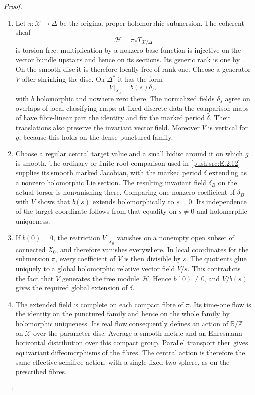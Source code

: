 \begin{proof}

\begin{enumerate}[label={$\langle1\rangle$\arabic*.},leftmargin=*]
\item Let $\pi:\mathcal X\to\Delta$ be the original
proper holomorphic submersion.  The coherent sheaf
\[
 \mathcal H=\pi_*T_{\mathcal X/\Delta}
\]
is torsion-free: multiplication by a nonzero base
function is injective on the vector bundle upstairs
and hence on its sections.  Its generic rank is
one by .  On the smooth disc it is therefore
locally free of rank one.  Choose a generator $V$
after shrinking the disc.  On $\Delta^*$ it has
the form
\[
 V|_{X_s}=b(s)\delta_s,
\]
with $b$ holomorphic and nowhere zero there.
The normalized fields $\delta_s$ agree on overlaps
of local classifying maps: at fixed discrete data
the comparison maps of  have fibre-linear
part the identity and fix the marked period
$\widehat\delta$.  Their translations also
preserve the invariant vector field.
Moreover $V$ is vertical for $g$, because this
holds on the dense punctured family.

\item Choose a regular central target value and a small
bidisc around it on which $g$ is smooth.  The
ordinary or finite-root comparison used in
\ref{push:src:E.2.12} supplies its smooth marked Jacobian, with
the marked period $\widehat\delta$ extending as
a nonzero holomorphic Lie section.  The resulting
invariant field $\delta_B$ on the actual torsor
is nonvanishing there.  Comparing one nonzero
coefficient of $\delta_B$ with $V$ shows that
$b(s)$ extends holomorphically to $s=0$.
Its independence of the target coordinate follows
from that equality on $s\ne0$ and holomorphic
uniqueness.

\item If $b(0)=0$, the restriction $V|_{X_0}$ vanishes
on a nonempty open subset of connected $X_0$,
and therefore vanishes everywhere.  In local
coordinates for the submersion $\pi$, every
coefficient of $V$ is then divisible by $s$.
The quotients glue uniquely to a global
holomorphic relative vector field $V/s$.
This contradicts the fact that $V$ generates
the free module $\mathcal H$.  Hence $b(0)\ne0$,
and $V/b(s)$ gives the required global extension
of $\delta$.

\item The extended field is complete on each compact
fibre of $\pi$.  Its time-one flow is the
identity on the punctured family and hence on
the whole family by holomorphic uniqueness.
Its real flow consequently defines an action
of $\mathbb R/\mathbb Z$ on $\mathcal X$
over the parameter disc.  Average a smooth
metric and an Ehresmann horizontal distribution
over this compact group.  Parallel transport
then gives equivariant diffeomorphisms of
the fibres.  The central action is therefore
the same effective semifree action, with a
single fixed two-sphere, as on the prescribed
fibres.


\end{enumerate}
\end{proof}
